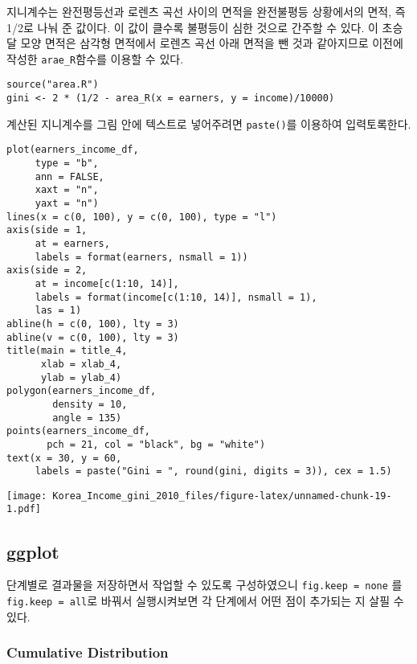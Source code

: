 \documentclass[
]{article}
\begin{document}
지니계수는 완전평등선과 로렌츠 곡선 사이의 면적을 완전불평등 상황에서의
면적, 즉 1/2로 나눠 준 값이다. 이 값이 클수록 불평등이 심한 것으로
간주할 수 있다. 이 초승달 모양 면적은 삼각형 면적에서 로렌츠 곡선 아래
면적을 뺀 것과 같아지므로 이전에 작성한 \texttt{arae\_R}함수를 이용할 수
있다.

\begin{verbatim}
source("area.R")
gini <- 2 * (1/2 - area_R(x = earners, y = income)/10000)
\end{verbatim}

계산된 지니계수를 그림 안에 텍스트로 넣어주려면 \texttt{paste()}를
이용하여 입력토록한다.

\begin{verbatim}
plot(earners_income_df, 
     type = "b", 
     ann = FALSE, 
     xaxt = "n", 
     yaxt = "n")
lines(x = c(0, 100), y = c(0, 100), type = "l")
axis(side = 1, 
     at = earners, 
     labels = format(earners, nsmall = 1))
axis(side = 2, 
     at = income[c(1:10, 14)], 
     labels = format(income[c(1:10, 14)], nsmall = 1), 
     las = 1)
abline(h = c(0, 100), lty = 3)
abline(v = c(0, 100), lty = 3)
title(main = title_4, 
      xlab = xlab_4, 
      ylab = ylab_4)
polygon(earners_income_df, 
        density = 10, 
        angle = 135)
points(earners_income_df, 
       pch = 21, col = "black", bg = "white")
text(x = 30, y = 60, 
     labels = paste("Gini = ", round(gini, digits = 3)), cex = 1.5)
\end{verbatim}

\texttt{[image: Korea\_Income\_gini\_2010\_files/figure-latex/unnamed-chunk-19-1.pdf]}

\hypertarget{ggplot}{%
\subsection{ggplot}\label{ggplot}}

단계별로 결과물을 저장하면서 작업할 수 있도록 구성하였으니
\texttt{fig.keep\ =\ \textquotesingle{}none\textquotesingle{}} 를
\texttt{fig.keep\ =\ \textquotesingle{}all\textquotesingle{}}로 바꿔서
실행시켜보면 각 단계에서 어떤 점이 추가되는 지 살필 수 있다.

\hypertarget{cumulative-distribution-1}{%
\subsubsection{Cumulative
Distribution}\label{cumulative-distribution-1}}
\end{document}
